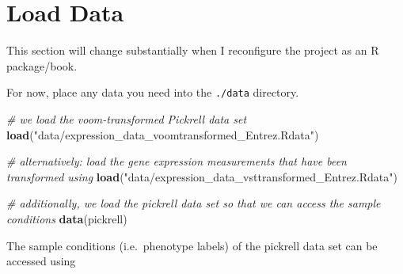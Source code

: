 \documentclass[
]{book}
\newenvironment{Shaded}{\begin{snugshade}}{\end{snugshade}}
\newcommand{\CommentTok}[1]{\textcolor[rgb]{0.56,0.35,0.01}{\textit{#1}}}
\newcommand{\FunctionTok}[1]{\textcolor[rgb]{0.13,0.29,0.53}{\textbf{#1}}}
\newcommand{\NormalTok}[1]{#1}
\newcommand{\SpecialCharTok}[1]{\textcolor[rgb]{0.81,0.36,0.00}{\textbf{#1}}}
\newcommand{\StringTok}[1]{\textcolor[rgb]{0.31,0.60,0.02}{#1}}
\begin{document}
\hypertarget{load-data}{%
\section{Load Data}\label{load-data}}

This section will change substantially when I reconfigure the project as an R package/book.

For now, place any data you need into the \texttt{./data} directory.

\begin{Shaded}
\begin{Highlighting}[]
\CommentTok{\# we load the voom{-}transformed Pickrell data set }
\FunctionTok{load}\NormalTok{(}\StringTok{"data/expression\_data\_voomtransformed\_Entrez.Rdata"}\NormalTok{)}

\CommentTok{\# alternatively: load the gene expression measurements that have been transformed using }
\FunctionTok{load}\NormalTok{(}\StringTok{"data/expression\_data\_vsttransformed\_Entrez.Rdata"}\NormalTok{)}

\CommentTok{\# additionally, we load the pickrell data set so that we can access the sample conditions}
\FunctionTok{data}\NormalTok{(pickrell)}
\end{Highlighting}
\end{Shaded}

The sample conditions (i.e.~phenotype labels) of the pickrell data set can be accessed using

\begin{Shaded}
\end{Shaded}
\end{document}
